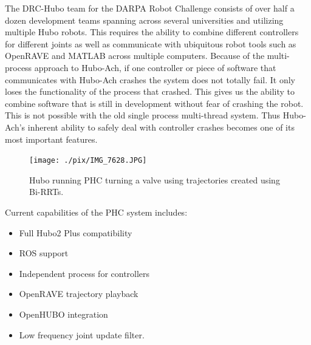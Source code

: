 The DRC-Hubo team for the DARPA Robot Challenge consists of over half a dozen development teams spanning across several universities and utilizing multiple Hubo robots.  
This requires the ability to combine different controllers for different joints as well as communicate with ubiquitous robot tools such as OpenRAVE and MATLAB across multiple computers.
Because of the multi-process approach to Hubo-Ach, if one controller or piece of software that communicates with Hubo-Ach crashes the system does not totally fail. 
It only loses the functionality of the process that crashed.
This gives us the ability to combine software that is still in development without fear of crashing the robot.
This is not possible with the old single process multi-thread system.
Thus Hubo-Ach's inherent ability to safely deal with controller crashes becomes one of its most important features.









\begin{figure}[thpb]
  \centering
\texttt{[image: ./pix/IMG\_7628.JPG]}
  \caption{Hubo running PHC turning a valve using trajectories created using Bi-RRTs. }
  \label{fig:valve}
\end{figure}

Current capabilities of the PHC system includes:

\begin{itemize}
\item Full Hubo2 Plus compatibility 
\item ROS support
\item Independent process for controllers
\item OpenRAVE trajectory playback
\item OpenHUBO integration 
\item Low frequency joint update filter.
\end{itemize}




